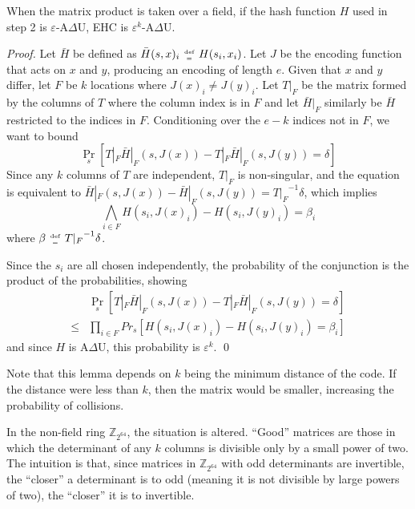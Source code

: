 \documentclass[runningheads]{llncs}
\newcommand{\ints}{\mathbb{Z}}
\newcommand{\defeq}{\;\genfrac{}{}{0pt}{2}{\text{def}}{=}\;}
\begin{document}
\begin{lemma}
  When the matrix product is taken over a field, if the hash function $H$ used in step 2 is $\varepsilon$-A$\Delta$U, EHC is $\varepsilon^k$-A$\Delta$U.
\end{lemma}
\begin{proof}
  Let $\bar{H}$ be defined as $\bar{H}(s, x)_i \defeq H(s_i, x_i)$.
  Let $J$ be the encoding function that acts on $x$ and $y$, producing an encoding of length $e$.
  Given that $x$ and $y$ differ, let $F$ be $k$ locations where $J(x)_i \neq J(y)_i$.
  Let $T|_F$ be the matrix formed by the columns of $T$ where the column index is in $F$ and let $\bar{H}|_F$ similarly be $\bar{H}$ restricted to the indices in $F$.
  Conditioning over the $e - k$ indices not in $F$, we want to bound
  \begin{equation}
    \label{ehc-delta}
    \Pr_s[T|_F \bar{H}|_F(s, J(x)) - T|_F \bar{H}|_F(s, J(y)) = \delta]
  \end{equation}
  Since any $k$ columns of $T$ are independent, $T|_F$ is non-singular, and the equation is equivalent to $\bar{H}|_F(s, J(x)) - \bar{H}|_F(s, J(y)) = {T|_F}^{-1} \delta$, which implies
  \[
  \bigwedge_{i \in F} H(s_i, J(x)_i) - H(s_i, J(y)_i) = \beta_i
  \]
  where $\beta \defeq {T|_F}^{-1} \delta$.

  Since the $s_i$ are all chosen independently, the probability of the conjunction is the product of the probabilities, showing
  \[
  \begin{array}{rl}
    &  \Pr_s[T|_F \bar{H}|_F (s,J(x)) - T|_F \bar{H}|_F(s,J(y)) = \delta] \\
  \leq &  \prod_{i \in F} Pr_s[H(s_i, J(x)_i) - H(s_i, J(y)_i) = \beta_i]
  \end{array}
  \]
  and since $H$ is A$\Delta$U, this probability is $\varepsilon^k$.  \qed
\end{proof}

Note that this lemma depends on $k$ being the minimum distance of the code.
If the distance were less than $k$, then the matrix would be smaller, increasing the probability of collisions.

In the non-field ring $\ints_{2^{64}}$, the situation is altered.
``Good'' matrices are those in which the determinant of any $k$ columns is divisible only by a small power of two.
The intuition is that, since matrices in $\ints_{2^{64}}$ with odd determinants are invertible, the ``closer'' a determinant is to odd (meaning it is not divisible by large powers of two), the ``closer'' it is to invertible.
\end{document}
